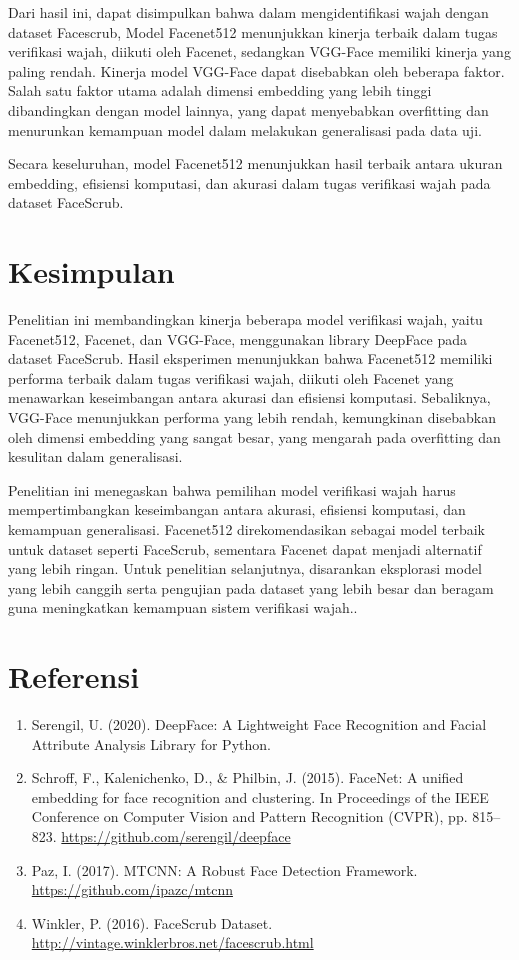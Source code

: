 \documentclass[a4paper, 11pt]{article}
\begin{document}
Dari hasil ini, dapat disimpulkan bahwa dalam mengidentifikasi wajah dengan dataset Facescrub, Model Facenet512 menunjukkan kinerja terbaik dalam tugas verifikasi wajah, diikuti oleh Facenet, sedangkan VGG-Face memiliki kinerja yang paling rendah.
Kinerja  model VGG-Face dapat disebabkan oleh beberapa faktor. Salah satu faktor utama adalah dimensi embedding yang lebih tinggi dibandingkan dengan model lainnya, yang dapat menyebabkan overfitting dan menurunkan kemampuan model dalam melakukan generalisasi pada data uji.

Secara keseluruhan, model Facenet512 menunjukkan hasil terbaik antara ukuran embedding, efisiensi komputasi, dan akurasi dalam tugas verifikasi wajah pada dataset FaceScrub. 




\section{Kesimpulan}
Penelitian ini membandingkan kinerja beberapa model verifikasi wajah, yaitu Facenet512, Facenet, dan VGG-Face, menggunakan library DeepFace pada dataset FaceScrub. Hasil eksperimen menunjukkan bahwa Facenet512 memiliki performa terbaik dalam tugas verifikasi wajah, diikuti oleh Facenet yang menawarkan keseimbangan antara akurasi dan efisiensi komputasi. Sebaliknya, VGG-Face menunjukkan performa yang lebih rendah, kemungkinan disebabkan oleh dimensi embedding yang sangat besar, yang mengarah pada overfitting dan kesulitan dalam generalisasi.

Penelitian ini menegaskan bahwa pemilihan model verifikasi wajah harus mempertimbangkan keseimbangan antara akurasi, efisiensi komputasi, dan kemampuan generalisasi. Facenet512 direkomendasikan sebagai model terbaik untuk dataset seperti FaceScrub, sementara Facenet dapat menjadi alternatif yang lebih ringan. Untuk penelitian selanjutnya, disarankan eksplorasi model yang lebih canggih serta pengujian pada dataset yang lebih besar dan beragam guna meningkatkan kemampuan sistem verifikasi wajah..


\section{Referensi}
\begin{enumerate}
    \item Serengil, U. (2020). DeepFace: A Lightweight Face Recognition and Facial Attribute Analysis Library for Python.
    \item Schroff, F., Kalenichenko, D., \& Philbin, J. (2015). FaceNet: A unified embedding for face recognition and clustering. In Proceedings of the IEEE Conference on Computer Vision and Pattern Recognition (CVPR), pp. 815–823.
    \url{https://github.com/serengil/deepface}
    \item Paz, I. (2017). MTCNN: A Robust Face Detection Framework. \url{https://github.com/ipazc/mtcnn}
    \item Winkler, P. (2016). FaceScrub Dataset. \url{http://vintage.winklerbros.net/facescrub.html}
    
\end{enumerate}
\end{document}
